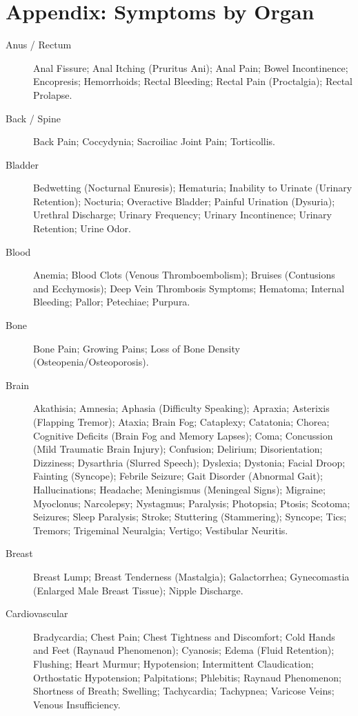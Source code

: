 
\chapter*{Appendix: Symptoms by Organ}

\begin{description}
  \item[Anus / Rectum] Anal Fissure; Anal Itching (Pruritus Ani); Anal Pain; Bowel Incontinence; Encopresis; Hemorrhoids; Rectal Bleeding; Rectal Pain (Proctalgia); Rectal Prolapse.
  \item[Back / Spine] Back Pain; Coccydynia; Sacroiliac Joint Pain; Torticollis.
  \item[Bladder] Bedwetting (Nocturnal Enuresis); Hematuria; Inability to Urinate (Urinary Retention); Nocturia; Overactive Bladder; Painful Urination (Dysuria); Urethral Discharge; Urinary Frequency; Urinary Incontinence; Urinary Retention; Urine Odor.
  \item[Blood] Anemia; Blood Clots (Venous Thromboembolism); Bruises (Contusions and Ecchymosis); Deep Vein Thrombosis Symptoms; Hematoma; Internal Bleeding; Pallor; Petechiae; Purpura.
  \item[Bone] Bone Pain; Growing Pains; Loss of Bone Density (Osteopenia/Osteoporosis).
  \item[Brain] Akathisia; Amnesia; Aphasia (Difficulty Speaking); Apraxia; Asterixis (Flapping Tremor); Ataxia; Brain Fog; Cataplexy; Catatonia; Chorea; Cognitive Deficits (Brain Fog and Memory Lapses); Coma; Concussion (Mild Traumatic Brain Injury); Confusion; Delirium; Disorientation; Dizziness; Dysarthria (Slurred Speech); Dyslexia; Dystonia; Facial Droop; Fainting (Syncope); Febrile Seizure; Gait Disorder (Abnormal Gait); Hallucinations; Headache; Meningismus (Meningeal Signs); Migraine; Myoclonus; Narcolepsy; Nystagmus; Paralysis; Photopsia; Ptosis; Scotoma; Seizures; Sleep Paralysis; Stroke; Stuttering (Stammering); Syncope; Tics; Tremors; Trigeminal Neuralgia; Vertigo; Vestibular Neuritis.
  \item[Breast] Breast Lump; Breast Tenderness (Mastalgia); Galactorrhea; Gynecomastia (Enlarged Male Breast Tissue); Nipple Discharge.
  \item[Cardiovascular] Bradycardia; Chest Pain; Chest Tightness and Discomfort; Cold Hands and Feet (Raynaud Phenomenon); Cyanosis; Edema (Fluid Retention); Flushing; Heart Murmur; Hypotension; Intermittent Claudication; Orthostatic Hypotension; Palpitations; Phlebitis; Raynaud Phenomenon; Shortness of Breath; Swelling; Tachycardia; Tachypnea; Varicose Veins; Venous Insufficiency.

\end{description}
